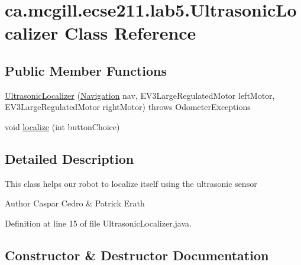 \hypertarget{classca_1_1mcgill_1_1ecse211_1_1lab5_1_1_ultrasonic_localizer}{}\section{ca.\+mcgill.\+ecse211.\+lab5.\+Ultrasonic\+Localizer Class Reference}
\label{classca_1_1mcgill_1_1ecse211_1_1lab5_1_1_ultrasonic_localizer}
\subsection*{Public Member Functions}
\begin{DoxyCompactItemize}
\item 
\hyperlink{classca_1_1mcgill_1_1ecse211_1_1lab5_1_1_ultrasonic_localizer_a47c08f2d2ec2ba664867231ca62020da}{Ultrasonic\+Localizer} (\hyperlink{classca_1_1mcgill_1_1ecse211_1_1lab5_1_1_navigation}{Navigation} nav, E\+V3\+Large\+Regulated\+Motor left\+Motor, E\+V3\+Large\+Regulated\+Motor right\+Motor)  throws Odometer\+Exceptions 
\item 
void \hyperlink{classca_1_1mcgill_1_1ecse211_1_1lab5_1_1_ultrasonic_localizer_a7fd82ab7240a07ae6947313c0769d4bc}{localize} (int button\+Choice)
\end{DoxyCompactItemize}


\subsection{Detailed Description}
This class helps our robot to localize itself using the ultrasonic sensor

\begin{DoxyAuthor}{Author}
Caspar Cedro \& Patrick Erath 
\end{DoxyAuthor}


Definition at line 15 of file Ultrasonic\+Localizer.\+java.



\subsection{Constructor \& Destructor Documentation}
\mbox{\label{classca_1_1mcgill_1_1ecse211_1_1lab5_1_1_ultrasonic_localizer_a47c08f2d2ec2ba664867231ca62020da}} 
